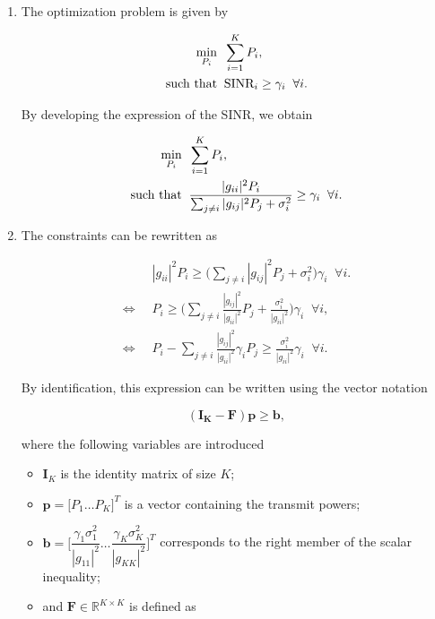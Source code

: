 \documentclass [a4paper, 11pt] {article}
\begin{document}
    \begin{solution}
     \begin{enumerate}
    \item The optimization problem is given by

    \begin{align}
    \min_{P_i} \; \; & \sum_{i=1}^{K} P_i,  \\
    \text{\normalfont such that} \; \;&  \text{\normalfont SINR}_i \geq \gamma_i \; \; \forall i.
    \end{align}

    By developing the expression of the SINR, we obtain

    \begin{align}
    \min_{P_i} \; \; & \sum_{i=1}^{K} P_i , \\
    \text{\normalfont such that} \; \;&  \frac{|g_{ii}|^2P_i}{ \sum_{j\neq i} |g_{ij}|^2P_j + \sigma_i^2} \geq \gamma_i \; \; \forall i.
    \end{align}

    \item The constraints can be rewritten as

    \begin{align}
        & |g_{ii}|^2P_i \geq \Big(\sum_{j\neq i} |g_{ij}|^2P_j + \sigma_i^2\Big) \gamma_i \; \; \forall i.\\
        \Leftrightarrow \; \; &  P_i \geq \Bigg(\sum_{j\neq i} \frac{|g_{ij}|^2}{|g_{ii}|^2}P_j + \frac{\sigma_i^2}{|g_{ii}|^2}\Bigg) \gamma_i \; \; \forall i,\\
        \Leftrightarrow \; \; &  P_i - \sum_{j\neq i} \frac{|g_{ij}|^2}{|g_{ii}|^2} \gamma_i P_j \geq \frac{\sigma_i^2}{|g_{ii}|^2} \gamma_i \; \; \forall i.
    \end{align}

    By identification, this expression can be written using the vector notation

    \begin{equation}
    (\mathbf{I_K} - \mathbf{F})\mathbf{p} \geq \mathbf{b},
    \end{equation}

    where the following variables are introduced

    \begin{itemize}
        \item $\mathbf{I}_K$ is the identity matrix of size $K$;
        \item $\mathbf{p} = \big[P_1 \hdots P_K\big]^T$ is a vector containing the transmit powers;
        \item $\mathbf{b} =  \Bigg[\dfrac{\gamma_1\sigma_1^2}{|g_{11}|^2} \hdots \dfrac{\gamma_K\sigma_K^2}{|g_{KK}|^2}\Bigg]^T$ corresponds to the right member of the scalar inequality;
        \item and $\mathbf{F} \in \mathbb{R}^{K \times K}$ is defined as


\end{itemize}
\end{enumerate}
\end{solution}
\end{document}
